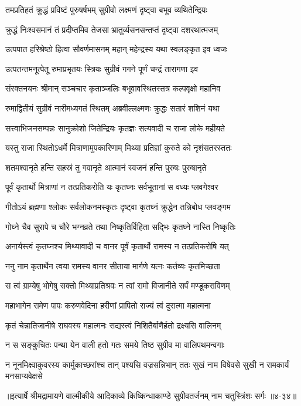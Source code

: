 
\twolineshloka
{तमप्रतिहतं क्रुद्धं प्रविष्टं पुरुषर्षभम्}
{सुग्रीवो लक्ष्मणं दृष्ट्वा बभूव व्यथितेन्द्रियः} %

\twolineshloka
{क्रुद्धं निःश्वसमानं तं प्रदीप्तमिव तेजसा}
{भ्रातुर्व्यसनसन्तप्तं दृष्ट्वा दशरथात्मजम्} %

\twolineshloka
{उत्पपात हरिश्रेष्ठो हित्वा सौवर्णमासनम्}
{महान् महेन्द्रस्य यथा स्वलङ्कृत इव ध्वजः} %

\twolineshloka
{उत्पतन्तमनूत्पेतू रुमाप्रभृतयः स्त्रियः}
{सुग्रीवं गगने पूर्णं चन्द्रं तारागणा इव} %

\twolineshloka
{संरक्तनयनः श्रीमान् सञ्चचार कृताञ्जलिः}
{बभूवावस्थितस्तत्र कल्पवृक्षो महानिव} %

\twolineshloka
{रुमाद्वितीयं सुग्रीवं नारीमध्यगतं स्थितम्}
{अब्रवील्लक्ष्मणः क्रुद्धः सतारं शशिनं यथा} %

\twolineshloka
{सत्त्वाभिजनसम्पन्नः सानुक्रोशो जितेन्द्रियः}
{कृतज्ञः सत्यवादी च राजा लोके महीयते} %

\twolineshloka
{यस्तु राजा स्थितोऽधर्मे मित्राणामुपकारिणाम्}
{मिथ्या प्रतिज्ञां कुरुते को नृशंसतरस्ततः} %

\twolineshloka
{शतमश्वानृते हन्ति सहस्रं तु गवानृते}
{आत्मानं स्वजनं हन्ति पुरुषः पुरुषानृते} %

\twolineshloka
{पूर्वं कृतार्थो मित्राणां न तत्प्रतिकरोति यः}
{कृतघ्नः सर्वभूतानां स वध्यः प्लवगेश्वर} %

\twolineshloka
{गीतोऽयं ब्रह्मणा श्लोकः सर्वलोकनमस्कृतः}
{दृष्ट्वा कृतघ्नं क्रुद्धेन तन्निबोध प्लवङ्गम} %

\twolineshloka
{गोघ्ने चैव सुरापे च चौरे भग्नव्रते तथा}
{निष्कृतिर्विहिता सद्भिः कृतघ्ने नास्ति निष्कृतिः} %

\twolineshloka
{अनार्यस्त्वं कृतघ्नश्च मिथ्यावादी च वानर}
{पूर्वं कृतार्थो रामस्य न तत्प्रतिकरोषि यत्} %

\twolineshloka
{ननु नाम कृतार्थेन त्वया रामस्य वानर}
{सीताया मार्गणे यत्नः कर्तव्यः कृतमिच्छता} %

\twolineshloka
{स त्वं ग्राम्येषु भोगेषु सक्तो मिथ्याप्रतिश्रवः}
{न त्वां रामो विजानीते सर्पं मण्डूकराविणम्} %

\twolineshloka
{महाभागेन रामेण पापः करुणवेदिना}
{हरीणां प्रापितो राज्यं त्वं दुरात्मा महात्मना} %

\twolineshloka
{कृतं चेन्नातिजानीषे राघवस्य महात्मनः}
{सद्यस्त्वं निशितैर्बाणैर्हतो द्रक्ष्यसि वालिनम्} %

\twolineshloka
{न स सङ्कुचितः पन्था येन वाली हतो गतः}
{समये तिष्ठ सुग्रीव मा वालिपथमन्वगाः} %

\twolineshloka
{न नूनमिक्ष्वाकुवरस्य कार्मुकाच्छरांश्च तान् पश्यसि वज्रसन्निभान्}
{ततः सुखं नाम विषेवसे सुखी न रामकार्यं मनसाप्यवेक्षसे} %


॥इत्यार्षे श्रीमद्रामायणे वाल्मीकीये आदिकाव्ये किष्किन्धाकाण्डे सुग्रीवतर्जनम् नाम चतुस्त्रिंशः सर्गः ॥४-३४॥
